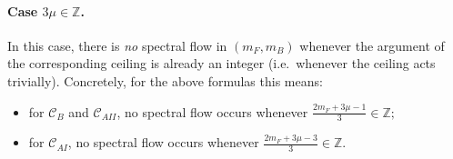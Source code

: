 \documentclass[11pt, a4paper]{article}
\numberwithin{equation}{section}
\begin{document}
\paragraph{Case $3\mu\in\mathbb{Z}$.}
In this case, there is \emph{no} spectral flow in $(m_F,m_B)$ whenever the argument of the corresponding ceiling
is already an integer (i.e.\ whenever the ceiling acts trivially). Concretely, for the above formulas this means:
\begin{itemize}
  \item for $\mathcal{C}_B$ and $\mathcal{C}_{AII}$, no spectral flow occurs whenever
  \(
    \frac{2m_F+3\mu-1}{3}\in\mathbb{Z};
  \)
  \item for $\mathcal{C}_{AI}$, no spectral flow occurs whenever
  \(
    \frac{2m_F+3\mu-3}{3}\in\mathbb{Z}.
  \)
\end{itemize}
\end{document}
